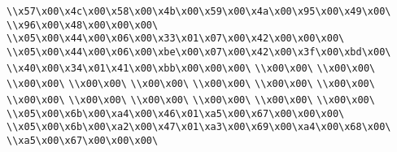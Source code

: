 \verb|\\x57\x00\x4c\x00\x58\x00\x4b\x00\x59\x00\x4a\x00\x95\x00\x49\x00\|\newline
\verb|\\x96\x00\x48\x00\x00\x00\|\newline
\verb|\\x05\x00\x44\x00\x06\x00\x33\x01\x07\x00\x42\x00\x00\x00\|\newline
\verb|\\x05\x00\x44\x00\x06\x00\xbe\x00\x07\x00\x42\x00\x3f\x00\xbd\x00\|\newline
\verb|\\x40\x00\x34\x01\x41\x00\xbb\x00\x00\x00\|\newline
\verb|\\x00\x00\|\newline
\verb|\\x00\x00\|\newline
\verb|\\x00\x00\|\newline
\verb|\\x00\x00\|\newline
\verb|\\x00\x00\|\newline
\verb|\\x00\x00\|\newline
\verb|\\x00\x00\|\newline
\verb|\\x00\x00\|\newline
\verb|\\x00\x00\|\newline
\verb|\\x00\x00\|\newline
\verb|\\x00\x00\|\newline
\verb|\\x00\x00\|\newline
\verb|\\x00\x00\|\newline
\verb|\\x00\x00\|\newline
\verb|\\x05\x00\x6b\x00\xa4\x00\x46\x01\xa5\x00\x67\x00\x00\x00\|\newline
\verb|\\x05\x00\x6b\x00\xa2\x00\x47\x01\xa3\x00\x69\x00\xa4\x00\x68\x00\|\newline
\verb|\\xa5\x00\x67\x00\x00\x00\|\newline
